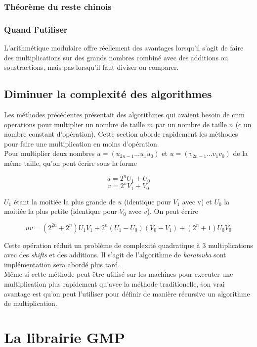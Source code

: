 \documentclass[letterpaper]{article}
\begin{document}
\subsubsection{Théorème du reste chinois}

\subsubsection{Quand l'utiliser}

L'arithmétique modulaire offre réellement des avantages lorsqu'il s'agit de faire
des multiplications sur des grands nombres combiné avec des additions ou
soustractions, mais pas lorsqu'il faut diviser ou comparer.

\subsection{Diminuer la complexité des algorithmes}

Les méthodes précédentes présentait des algorithmes qui avaient besoin de cnm operations pour multiplier un nombre de taille
$m$ par un nombre de taille $n$ (c un nombre constant d'opération). Cette section aborde rapidement les méthodes pour faire
une multiplication en moins d'opération. \\

Pour multiplier deux nombres $u = (u_{2n-1} \dots u_1 u_0)$ et $u = (v_{2n-1} \dots v_1 v_0)$ de la même taille, qu'on peut
écrire sous la forme

  $$u = 2^{n} U_1 + U_0$$
  $$v = 2^{n} V_1 + V_0$$

$U_1$ étant la moitiée la plus grande de $u$ (identique pour $V_1$ avec v) et $U_0$ la moitiée la plus petite (identique pour
$V_0$ avec $v$). On peut écrire

  $$uv = (2^{2n} + 2^n) U_1 V_1 + 2^n (U_1 - U_0) (V_0 - V_1) + (2^n + 1) U_0 V_0$$

Cette opération réduit un problème de complexité quadratique à 3 multiplications avec des \emph{shifts} et des additions. Il
s'agit de l'algorithme de \emph{karatsuba} sont implémentation sera abordé plus tard.\\

Même si cette méthode peut être utilisé sur les machines pour executer une multiplication plus rapidement qu'avec la méthode
traditionelle, son vrai avantage est qu'on peut l'utiliser pour définir de manière récursive un algorithme de multiplication.

\section{La librairie GMP}
\end{document}
